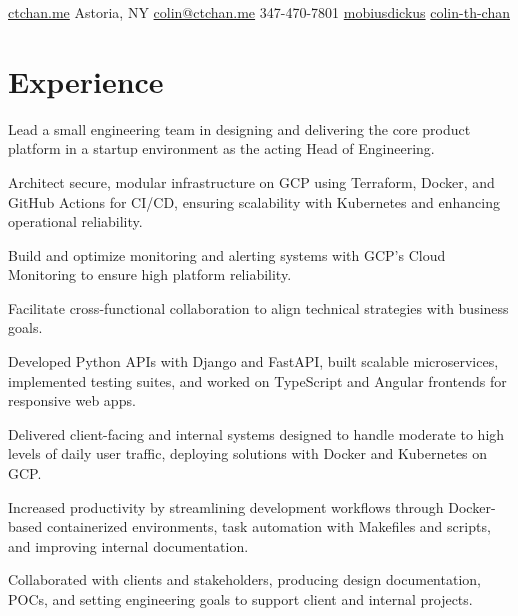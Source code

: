 \documentclass[]{plushcv}
\begin{document}
%
%
{
  \contactline
  {\href{https://ctchan.me}{ctchan.me}}
  {Astoria, NY}
  {\href{mailto:colin@ctchan.me}{colin@ctchan.me}}
  {347-470-7801}
  {\href{https://www.github.com/mobiusdickus}{mobiusdickus}}
  {\href{https://www.linkedin.com/in/colin-th-chan/}{colin-th-chan}}
}

%
%

\begin{minipage}[t]{0.70\textwidth} 



\section{Experience}
\vspace{\topsep} %
\begin{tightemize}
\sectionsep
\item Lead a small engineering team in designing and delivering the core product platform in a startup environment as the acting Head of Engineering.
\item Architect secure, modular infrastructure on GCP using Terraform, Docker, and GitHub Actions for CI/CD, ensuring scalability with Kubernetes and enhancing operational reliability.
\item Build and optimize monitoring and alerting systems with GCP’s Cloud Monitoring to ensure high platform reliability.
\item Facilitate cross-functional collaboration to align technical strategies with business goals.
\end{tightemize}
\sectionsep

\begin{tightemize}
\sectionsep
\item Developed Python APIs with Django and FastAPI, built scalable microservices, implemented testing suites, and worked on TypeScript and Angular frontends for responsive web apps.
\item Delivered client-facing and internal systems designed to handle moderate to high levels of daily user traffic, deploying solutions with Docker and Kubernetes on GCP.
\item Increased productivity by streamlining development workflows through Docker-based containerized environments, task automation with Makefiles and scripts, and improving internal documentation.
\item Collaborated with clients and stakeholders, producing design documentation, POCs, and setting engineering goals to support client and internal projects.
\end{tightemize}
\sectionsep


\end{minipage}
\end{document}
